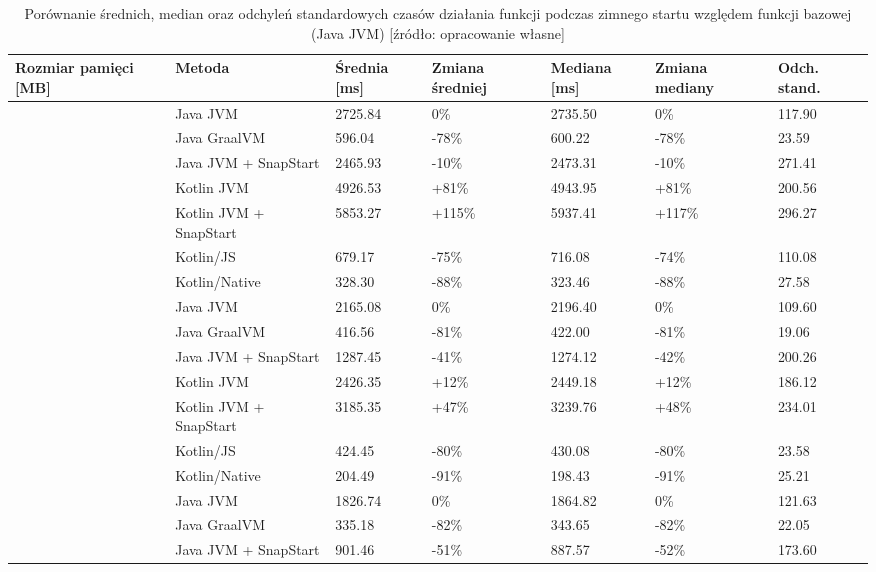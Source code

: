 \begin{table}[htbp]
\centering
\caption{Porównanie średnich, median oraz odchyleń standardowych czasów działania funkcji podczas zimnego startu względem funkcji bazowej (Java JVM) [źródło: opracowanie własne]}
\small
\begin{tabular}{|>{\centering\arraybackslash}m{2cm}|l|p{1.5cm}|p{1.5cm}|p{1.5cm}|p{1.5cm}|p{1.5cm}|}
\toprule
Rozmiar pamięci [MB] & Metoda & Średnia [ms] & Zmiana średniej & Mediana [ms] & Zmiana mediany & Odch. stand. \\
\midrule
\multirow{7}{*}{128} & Java JVM & 2725.84 & \mbox{0\%} & 2735.50 & \mbox{0\%} & 117.90 \\
 & Java GraalVM & 596.04 & \mbox{-78\%} & 600.22 & \mbox{-78\%} & 23.59 \\
 & Java JVM + SnapStart & 2465.93 & \mbox{-10\%} & 2473.31 & \mbox{-10\%} & 271.41 \\
 & Kotlin JVM & 4926.53 & \mbox{+81\%} & 4943.95 & \mbox{+81\%} & 200.56 \\
 & Kotlin JVM + SnapStart & 5853.27 & \mbox{+115\%} & 5937.41 & \mbox{+117\%} & 296.27 \\
 & Kotlin/JS & 679.17 & \mbox{-75\%} & 716.08 & \mbox{-74\%} & 110.08 \\
 & Kotlin/Native & 328.30 & \mbox{-88\%} & 323.46 & \mbox{-88\%} & 27.58 \\
\midrule
\multirow{7}{*}{256} & Java JVM & 2165.08 & \mbox{0\%} & 2196.40 & \mbox{0\%} & 109.60 \\
 & Java GraalVM & 416.56 & \mbox{-81\%} & 422.00 & \mbox{-81\%} & 19.06 \\
 & Java JVM + SnapStart & 1287.45 & \mbox{-41\%} & 1274.12 & \mbox{-42\%} & 200.26 \\
 & Kotlin JVM & 2426.35 & \mbox{+12\%} & 2449.18 & \mbox{+12\%} & 186.12 \\
 & Kotlin JVM + SnapStart & 3185.35 & \mbox{+47\%} & 3239.76 & \mbox{+48\%} & 234.01 \\
 & Kotlin/JS & 424.45 & \mbox{-80\%} & 430.08 & \mbox{-80\%} & 23.58 \\
 & Kotlin/Native & 204.49 & \mbox{-91\%} & 198.43 & \mbox{-91\%} & 25.21 \\
\midrule
\multirow{7}{*}{512} & Java JVM & 1826.74 & \mbox{0\%} & 1864.82 & \mbox{0\%} & 121.63 \\
 & Java GraalVM & 335.18 & \mbox{-82\%} & 343.65 & \mbox{-82\%} & 22.05 \\
 & Java JVM + SnapStart & 901.46 & \mbox{-51\%} & 887.57 & \mbox{-52\%} & 173.60 \\

\end{tabular}
\end{table}

